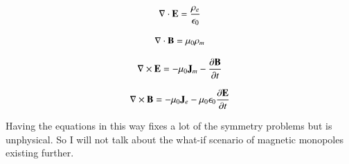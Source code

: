 \documentclass[preprint, review,12pt]{elsarticle}
\def\x{\times}
\def\.{\cdot}
\def\b{\textbf}
\def\div{\nabla \.}
\def\curl{\nabla \x}
\newcommand{\pd}[2]{\frac{\partial #1 }{\partial #2}}
\begin{document}
\begin{equation}
    \div \b E  = \frac{\rho_e}{\epsilon_0}
\end{equation}

\begin{equation}
    \div \b B  = \mu_0 \rho_m
\end{equation}

\begin{equation}
    \curl \b E  = -\mu_0 \b J_m - \pd{\b B}{t}
\end{equation}

\begin{equation}
    \curl \b B  = -\mu_0 \b J_e - \mu_0\epsilon_0\pd{\b E}{t}
\end{equation}


Having the equations in this way fixes a lot of the symmetry problems but is unphysical. So I will not talk about the what-if scenario of magnetic monopoles existing further.
    













































\end{document}
